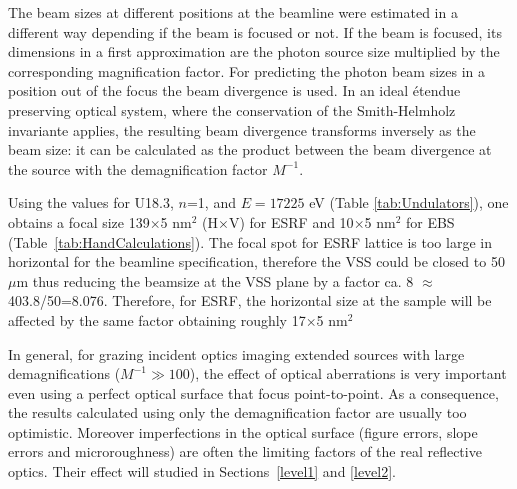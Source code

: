 \documentclass{iucr}              %
\newcommand{\inred}[1]{{\color{red}#1}}
\begin{document}
The beam sizes at different positions at the beamline were estimated in a different way depending if the beam is focused or not. If the beam is focused, its dimensions in a first approximation are the photon source size multiplied by the corresponding magnification factor. For predicting the photon beam sizes in a position out of the focus the beam divergence is used. In an ideal {\'{e}}tendue preserving optical system, where the conservation of the Smith-Helmholz invariante applies, the resulting beam divergence transforms inversely as the beam size: it can be calculated as the product between the beam divergence at the source with the demagnification factor $M^{-1}$.

Using the values for U18.3, $n$=1, and  $E=17225$ eV (Table \ref{tab:Undulators}), one obtains a focal size 139$\times$5 nm$^2$ (H$\times$V) for ESRF and 10$\times$5 nm$^2$ for EBS (Table~\ref{tab:HandCalculations}). The focal spot for ESRF lattice is too large in horizontal for the beamline specification, therefore the VSS could be closed to 50$\mu$m thus reducing the beamsize at the VSS plane by a factor ca. 8 \inred{$\approx$ 403.8/50=8.076}. Therefore, for ESRF, the horizontal size at the sample will be affected by the same factor obtaining roughly 17$\times$5 nm$^2$

In general, for grazing incident optics imaging extended sources with large demagnifications ($M^{-1} \gg 100$), the effect of optical aberrations is very important even using a perfect optical surface that focus point-to-point. As a consequence, the results calculated using only the demagnification factor are usually too optimistic. Moreover imperfections in the optical surface (figure errors, slope errors and microroughness) are often the limiting factors of the real reflective optics. Their effect will studied in Sections~\ref{level1} and \ref{level2}.
\end{document}

